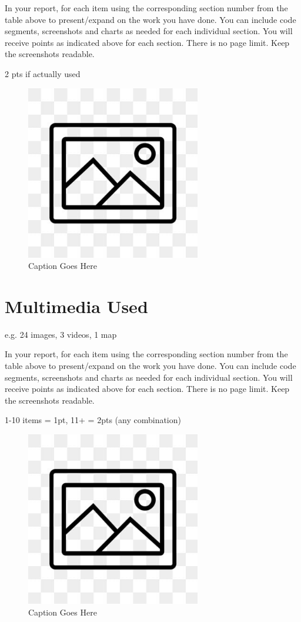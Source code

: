 \documentclass[12pt, letterpaper]{article}
\begin{document}
In your report, for each item using the corresponding section number from the table above to present/expand on the work you have done. You can include code segments, screenshots and charts as needed for each individual section. You will receive points as indicated above for each section. There is no page limit. Keep the screenshots readable.

2 pts if actually used

\begin{figure}[htbp]
	\centering
	\includegraphics[width=3in]{images/placeholder.jpg}
	\caption{Caption Goes Here}
 \end{figure}

 \newpage

\section{Multimedia Used}
e.g. 24 images, 3 videos, 1 map

In your report, for each item using the corresponding section number from the table above to present/expand on the work you have done. You can include code segments, screenshots and charts as needed for each individual section. You will receive points as indicated above for each section. There is no page limit. Keep the screenshots readable.

1-10 items = 1pt, 11+ = 2pts (any combination)

\begin{figure}[htbp]
	\centering
	\includegraphics[width=3in]{images/placeholder.jpg}
	\caption{Caption Goes Here}
 \end{figure}
\end{document}
